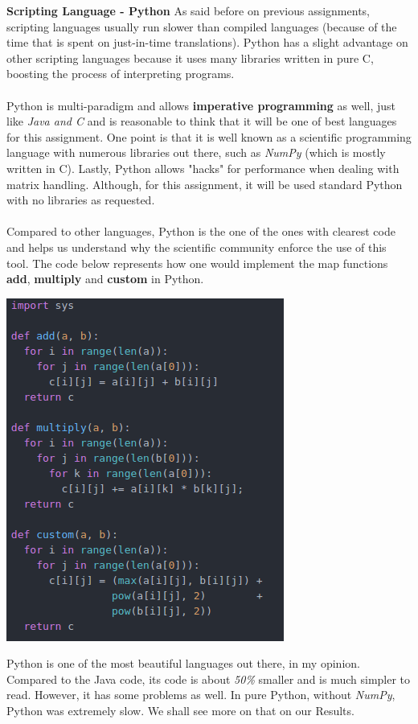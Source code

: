 \documentclass[conference]{IEEEtran}
\begin{document}
\textbf{ Scripting Language - Python }
As said before on previous assignments, scripting languages usually run slower than compiled languages (because of the time that is spent on just-in-time translations). Python has a slight advantage on other scripting languages because it uses many libraries written in pure C, boosting the process of interpreting programs.
\\\\
Python is multi-paradigm and allows \textbf{imperative programming} as well, just like \textit{Java and C} and is reasonable to think that it will be one of best languages for this assignment. One point is that it is well known as a scientific programming language with numerous libraries out there, such as \textit{NumPy} (which is mostly written in C). Lastly, Python allows "hacks" for performance when dealing with matrix handling. Although, for this assignment, it will be used standard Python with no libraries as requested.
\\\\
Compared to other languages, Python is the one of the ones with clearest code and helps us understand why the scientific community enforce the use of this tool. The code below represents how one would implement the map functions \textbf{add}, \textbf{multiply} and \textbf{custom} in Python.

\includegraphics[scale=0.62]{python_code}

Python is one of the most beautiful languages out there, in my opinion. Compared to the Java code, its code is about \textit{50\%} smaller and is much simpler to read. However, it has some problems as well. In pure Python, without \textit{NumPy}, Python was extremely slow. We shall see more on that on our Results.
\end{document}
